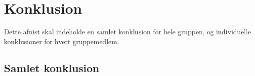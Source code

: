 \chapter{Konklusion}
Dette afnist skal indeholde en samlet konklusion for hele gruppen, og individuelle konklusioner for hvert gruppemedlem.

\section{Samlet konklusion}